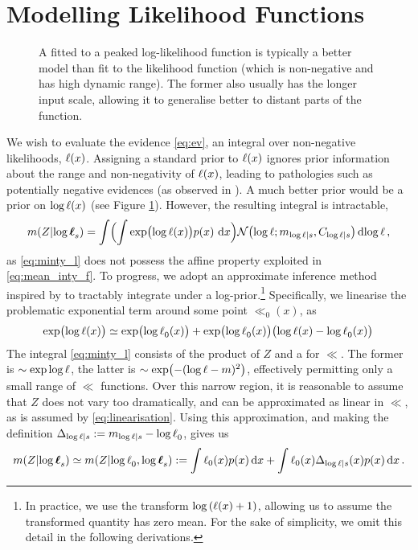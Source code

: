 \documentclass{article} %
\newcommand{\De}{\Delta_{\ll|s}}
\begin{document}
\section{Modelling Likelihood Functions}\label{sec:model_lik}
%
 \begin{figure}
 \centering
 \caption{A \gpb fitted to a peaked log-likelihood function  is typically a better model than \gpb fit to the likelihood function (which is non-negative and has high dynamic range). The former \gpb  also usually has the longer input scale, allowing it to generalise better to distant parts of the function. }
 \label{fig:log_is_better}
 \end{figure}
%
We wish to evaluate the evidence \eqref{eq:ev}, an integral over non-negative likelihoods, $\lfn(\lfv)$. Assigning a standard \gpb prior to $\lfn(\lfv)$ ignores prior information about the range and non-negativity of $\lfn(\lfv)$, leading to pathologies such as potentially negative evidences (as observed in \cite{BZMonteCarlo}).  A much better prior would be a \gpb prior on $\log \lfn(x)$ (see Figure \ref{fig:log_is_better}). However, the resulting integral is intractable,
\begin{equation}\label{eq:minty_l}
\mean{\If}{\vll_s}
 =\int \Bigl( \int \exp\bigl(\ll(\lfv)\bigr)\po{\lfv}\,\ud\lfv\Bigr)
\N{\ll}{\meancondfn{\ll}{s}}{C_{\ll|s}} \ud \ll\,,
\end{equation}
as \eqref{eq:minty_l} does not possess the affine property exploited in \eqref{eq:mean_inty_f}. To progress, we adopt an approximate inference method inspired by \cite{BQR} to tractably integrate under a log-\gpb prior.\footnote{In practice, we use the transform 
$\log\left(\lfn(\lfv) + 1\right)$, allowing us to assume the transformed quantity has zero mean. For the sake of simplicity, we omit this detail in the following derivations.} 
Specifically, we linearise the problematic exponential term around some point $\ll_0(x)$, as
\begin{equation}
 \exp\bigl(\ll(\lfv)\bigr) \simeq \exp\bigl(\ll_0(\lfv)\bigr) + \exp\bigl(\ll_0(\lfv)\bigr) \bigl(\ll(x)  - \ll_0(x)\bigr)\label{eq:linearisation}\,
\end{equation}
The integral \eqref{eq:minty_l} consists of the product of $Z$ and a \gpb for $\ll$. The former is $\sim\exp \log\lfn$, the latter is $\sim\exp\bigl(-(\log\lfn-m)^2\bigr)$, effectively permitting only a small range of $\ll$ functions. Over this narrow region, it is reasonable to assume that $Z$ does not vary too dramatically, and can be approximated as linear in $\ll$, as is assumed by \eqref{eq:linearisation}. Using this approximation, and making the definition
$
\De \deq m_{\ll|s} - \ll_0
$,
gives us
\begin{equation}\label{eq:minty_l2}
\mean{\If}{\vll_s}
 \simeq 
\mean{\If}{\ll_0, \vll_s}
\deq
\int \lfn_0(\lfv)\po{\lfv}\ud\lfv
+\int \lfn_0(\lfv)\De(x)\po{\lfv}\ud\lfv
\,.
\end{equation}
\end{document}
